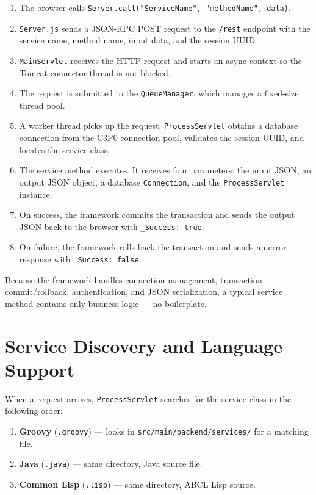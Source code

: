 \begin{enumerate}
  \item The browser calls \texttt{Server.call("ServiceName", "methodName", data)}.
  \item \texttt{Server.js} sends a JSON-RPC POST request to the \texttt{/rest} endpoint with the service name, method name, input data, and the session UUID.
  \item \texttt{MainServlet} receives the HTTP request and starts an async context so the Tomcat connector thread is not blocked.
  \item The request is submitted to the \texttt{QueueManager}, which manages a fixed-size thread pool.
  \item A worker thread picks up the request.  \texttt{ProcessServlet} obtains a database connection from the C3P0 connection pool, validates the session UUID, and locates the service class.
  \item The service method executes.  It receives four parameters: the input JSON, an output JSON object, a database \texttt{Connection}, and the \texttt{ProcessServlet} instance.
  \item On success, the framework commits the transaction and sends the output JSON back to the browser with \texttt{\_Success: true}.
  \item On failure, the framework rolls back the transaction and sends an error response with \texttt{\_Success: false}.
\end{enumerate}

\begin{tipbox}
Because the framework handles connection management, transaction commit/rollback, authentication, and JSON serialization, a typical service method contains only business logic --- no boilerplate.
\end{tipbox}

\section{Service Discovery and Language Support}
\label{sec:arch-languages}

When a request arrives, \texttt{ProcessServlet} searches for the service class in the following order:

\begin{enumerate}
  \item \textbf{Groovy} (\texttt{.groovy}) --- looks in \texttt{src/main/backend/services/} for a matching file.
  \item \textbf{Java} (\texttt{.java}) --- same directory, Java source file.
  \item \textbf{Common Lisp} (\texttt{.lisp}) --- same directory, ABCL Lisp source.
\end{enumerate}

